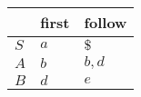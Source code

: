 \documentclass{standalone}
\providecommand\lightrule{%
	\arrayrulecolor{black!30}%
	\midrule[\lightrulewidth]%
	\arrayrulecolor{black}}
\begin{document}
\begin{tabularx}{\textwidth}{XXX}
         & first & follow \\
        \midrule
            \(S\)
            &
            \(a\)
            &
            \(\$\)
            \\ \lightrule
            \(A\)
            &
            \(b\)
            &
            \(b, d\)
            \\ \lightrule
            \(B\)
            &
            \(d\)
            &
            \(e\)
\end{tabularx}
\end{document}
